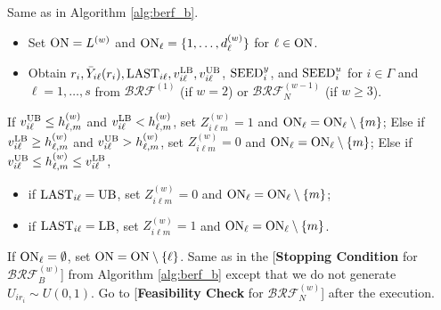 \documentclass[11pt]{article}
\begin{document}
\begin{algorithm}[h!]
{\fontsize{10}{13}\selectfont	
    \begin{algorithmic}
    \caption{The $w$th Pass of Procedure Bernoulli Recycled Feasibility, $\mathcal{BRF}_{N}^{(w)}$, where $w\geq 2$}
    \label{alg:berf_n}
		\State {\bf [Setup:]} Same as in Algorithm \ref{alg:berf_b}. 
		\State [{\bf Initialization}:] 
		\begin{itemize}%
            \item Set ${\rm ON}=L^{(w)}$ and ${\rm ON}_\ell=\{1,\ldots,d_\ell^{(w)}\}$ for $\ell\in {\rm ON}$. 
            \item Obtain $r_i, \bar{Y}_{i\ell}(r_i), {\rm LAST}_{i\ell}, v_{i\ell}^{\rm LB}, v_{i\ell}^{\rm UB}$, ${\rm SEED}^y_i$, and ${\rm SEED}^u_i$ for $i\in\Gamma$ and $\ell=1,\ldots,s$ from $\mathcal{BRF}^{(1)}$ (if $w=2$) or $\mathcal{BRF}_N^{(w-1)}$ (if $w\geq 3$). 
		\end{itemize}
        \State If $v_{i\ell}^{\rm UB}\leq h_{\ell,m}^{(w)}$ and $v_{i\ell}^{\rm LB}<h_{\ell,m}^{(w)}$, set $Z_{i\ell m}^{(w)}=1$ and ${\rm ON}_\ell={\rm ON}_\ell \setminus \{m\}$;
        \State Else if $v_{i\ell}^{\rm LB}\geq h_{\ell, m}^{(w)}$ and $v_{i\ell}^{\rm UB}>h_{\ell,m}^{(w)}$, set $Z_{i\ell m}^{(w)}=0$ and ${\rm ON}_\ell={\rm ON}_\ell \setminus \{m\}$;
        \State Else if $v_{i\ell}^{\rm UB}\leq h_{\ell, m}^{(w)}\leq v_{i\ell}^{\rm LB}$,
            \begin{itemize}[leftmargin=2.5cm]
                \item[] if ${\rm LAST}_{i\ell}={\rm UB}$, set $Z_{i\ell m}^{(w)}=0$ and ${\rm ON}_\ell={\rm ON}_\ell \setminus \{m\}$;
                \item[] if ${\rm LAST}_{i\ell}={\rm LB}$, set $Z_{i\ell m}^{(w)}=1$ and ${\rm ON}_\ell={\rm ON}_\ell \setminus \{m\}$.
            \end{itemize}
        \EndFor
        \State If ${\rm ON}_\ell=\emptyset$, set ${\rm ON}={\rm ON} \setminus \{\ell\}$.
    \EndFor
     Same as in the [{\bf Stopping Condition} for $\mathcal{BRF}_B^{(w)}$] from Algorithm \ref{alg:berf_b} except that we do not generate $U_{ir_i}\sim U(0,1)$. Go to [{\bf Feasibility Check} for $\mathcal{BRF}_N^{(w)}$] after the execution.


\end{algorithmic}}
\end{algorithm}
\end{document}
